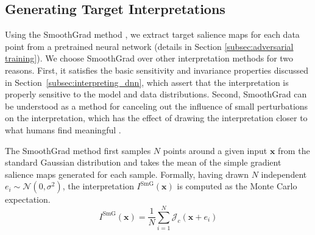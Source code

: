 

\subsection{Generating Target Interpretations} \label{subsec:target_interpretation}
Using the SmoothGrad method \cite{smoothgrad}, we extract target salience maps for each data point from a pretrained neural network (details in Section \ref{subsec:adversarial training}).
%
We choose SmoothGrad over other interpretation methods for two reasons. First, it satisfies the basic sensitivity and invariance properties \cite{sanity_checks_salience_maps,unreliability} discussed in Section~\ref{subsec:interpreting_dnn}, which assert that the interpretation is properly sensitive to the model and data distributions. Second, SmoothGrad can be understood as a method for canceling out the influence of small perturbations on the interpretation, which has the effect of drawing the interpretation closer to what humans find meaningful \cite{smoothgrad}.

The SmoothGrad method first samples $N$ points around a given input $\bm x$ from the standard Gaussian distribution and 
takes the mean of the simple gradient salience maps generated for each sample. Formally, having drawn $N$ independent $e_i \sim \mathcal{N}(0, \sigma^2)$, the interpretation $I^\text{SmG}(\bm x)$ is computed as the Monte Carlo expectation.
\begin{equation}
    I^\text{SmG}(\bm{x}) = \frac{1}{N}\sum_{i = 1}^N \mathcal{J}_{c}(\bm x + e_i)
    \label{eq:our-smoothgrad}
\end{equation}

